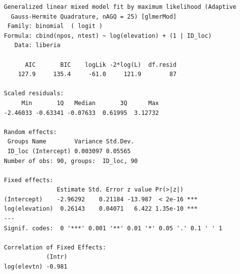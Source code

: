 \documentclass[
  letterpaper,
]{krantz}
\newenvironment{Shaded}{\begin{snugshade}}{\end{snugshade}}
\newcommand{\AttributeTok}[1]{\textcolor[rgb]{0.13,0.29,0.53}{#1}}
\newcommand{\CommentTok}[1]{\textcolor[rgb]{0.56,0.35,0.01}{\textit{#1}}}
\newcommand{\DecValTok}[1]{\textcolor[rgb]{0.00,0.00,0.81}{#1}}
\newcommand{\FunctionTok}[1]{\textcolor[rgb]{0.13,0.29,0.53}{\textbf{#1}}}
\newcommand{\NormalTok}[1]{#1}
\newcommand{\OtherTok}[1]{\textcolor[rgb]{0.56,0.35,0.01}{#1}}
\newcommand{\SpecialCharTok}[1]{\textcolor[rgb]{0.81,0.36,0.00}{\textbf{#1}}}
\newcommand{\StringTok}[1]{\textcolor[rgb]{0.31,0.60,0.02}{#1}}
\begin{document}
\begin{Shaded}
\end{Shaded}

\begin{verbatim}
Generalized linear mixed model fit by maximum likelihood (Adaptive
  Gauss-Hermite Quadrature, nAGQ = 25) [glmerMod]
 Family: binomial  ( logit )
Formula: cbind(npos, ntest) ~ log(elevation) + (1 | ID_loc)
   Data: liberia

      AIC       BIC    logLik -2*log(L)  df.resid 
    127.9     135.4     -61.0     121.9        87 

Scaled residuals: 
     Min       1Q   Median       3Q      Max 
-2.46033 -0.63341 -0.07633  0.61995  3.12732 

Random effects:
 Groups Name        Variance Std.Dev.
 ID_loc (Intercept) 0.003097 0.05565 
Number of obs: 90, groups:  ID_loc, 90

Fixed effects:
               Estimate Std. Error z value Pr(>|z|)    
(Intercept)    -2.96292    0.21184 -13.987  < 2e-16 ***
log(elevation)  0.26143    0.04071   6.422 1.35e-10 ***
---
Signif. codes:  0 '***' 0.001 '**' 0.01 '*' 0.05 '.' 0.1 ' ' 1

Correlation of Fixed Effects:
            (Intr)
log(elevtn) -0.981
\end{verbatim}
\end{document}
